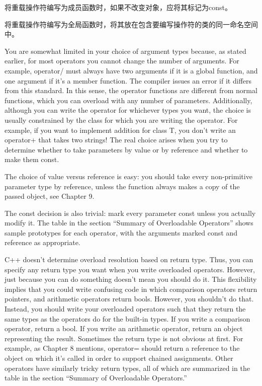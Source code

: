 将重载操作符编写为成员函数时，如果不改变对象，应将其标记为const。

将重载操作符编写为全局函数时，将其放在包含要编写操作符的类的同一命名空间中。


You are somewhat limited in your choice of argument types because, as stated earlier, for most operators you cannot change the number of arguments. For example, operator/ must always have two arguments if it is a global function, and one argument if it’s a member function. The compiler issues an error if it differs from this standard. In this sense, the operator functions are different from normal functions, which you can overload with any number of parameters. Additionally, although you can write the operator for whichever types you want, the choice is usually constrained by the class for which you are writing the operator. For example, if you want to implement addition for class T, you don’t write an operator+ that takes two strings! The real choice arises when you try to determine whether to take parameters by value or by reference and whether to make them const.

The choice of value versus reference is easy: you should take every non-primitive parameter type by reference, unless the function always makes a copy of the passed object, see Chapter 9.

The const decision is also trivial: mark every parameter const unless you actually modify it. The table in the section “Summary of Overloadable Operators” shows sample prototypes for each operator, with the arguments marked const and reference as appropriate.


C++ doesn’t determine overload resolution based on return type. Thus, you can specify any return type you want when you write overloaded operators. However, just because you can do something doesn’t mean you should do it. This flexibility implies that you could write confusing code in which comparison operators return pointers, and arithmetic operators return bools. However, you shouldn’t do that. Instead, you should write your overloaded operators such that they return the same types as the operators do for the built-in types. If you write a comparison operator, return a bool. If you write an arithmetic operator, return an object representing the result. Sometimes the return type is not obvious at first. For example, as Chapter 8 mentions, operator= should return a reference to the object on which it’s called in order to support chained assignments. Other operators have similarly tricky return types, all of which are summarized in the table in the section “Summary of Overloadable Operators.”

